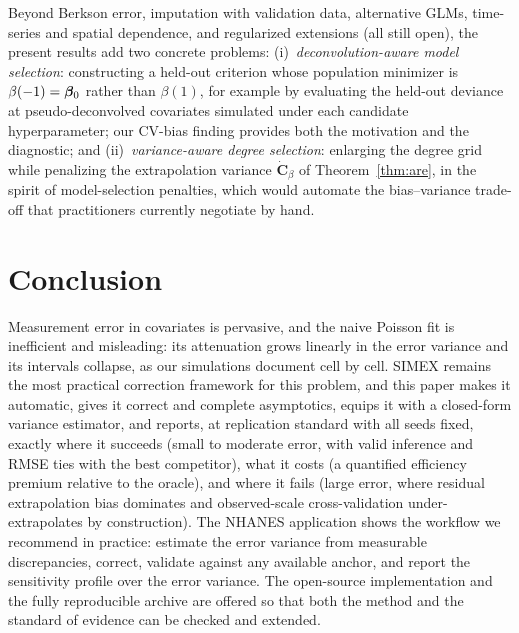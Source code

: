 Beyond Berkson error, imputation with validation data, alternative
GLMs, time-series and spatial dependence, and regularized extensions
(all still open), the present results add two concrete problems:
(i)~\emph{deconvolution-aware model selection}: constructing a
held-out criterion whose population minimizer is
$\beta(-1)=\bm{\beta}_0$ rather than $\beta(1)$, for example by evaluating
the held-out deviance at pseudo-deconvolved covariates simulated under
each candidate hyperparameter; our CV-bias finding provides both the
motivation and the diagnostic; and (ii)~\emph{variance-aware degree
selection}: enlarging the degree grid while penalizing the
extrapolation variance $\dot{\bm C}_\beta$ of Theorem~\ref{thm:are},
in the spirit of model-selection penalties, which would automate the
bias--variance trade-off that practitioners currently negotiate by
hand.

\section{Conclusion}\label{sec:conclusion}

Measurement error in covariates is pervasive, and the naive Poisson
fit is inefficient and misleading: its attenuation grows
linearly in the error variance and its intervals collapse, as our
simulations document cell by cell. SIMEX remains the most practical
correction framework for this problem, and this paper makes it
automatic, gives it correct and complete asymptotics, equips it with a
closed-form variance estimator, and reports, at replication
standard with all seeds fixed, exactly where it succeeds (small to
moderate error, with valid inference and RMSE ties with the best
competitor), what it costs (a quantified efficiency premium relative
to the oracle), and where it fails (large error, where residual
extrapolation bias dominates and observed-scale cross-validation
under-extrapolates by construction). The NHANES application shows the
workflow we recommend in practice: estimate the error variance from
measurable discrepancies, correct, validate against any available
anchor, and report the sensitivity profile over the error variance.
The open-source implementation and the fully reproducible archive are
offered so that both the method and the standard of evidence can be
checked and extended.

